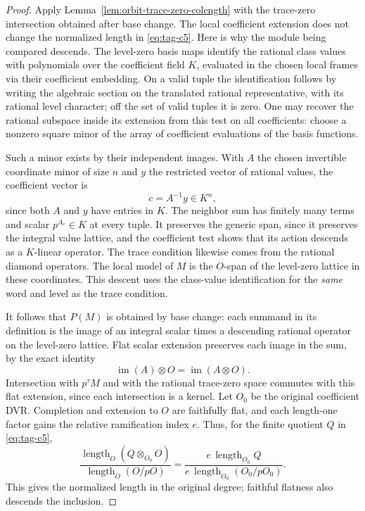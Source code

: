 \begin{proof}

Apply Lemma~\ref{lem:orbit-trace-zero-colength} with the
trace-zero intersection obtained after base change.
The local coefficient extension does not change the normalized
length in \eqref{eq:tag-c5}. Here is why the module being compared descends.
The level-zero basis maps identify the rational class values with
polynomials over the coefficient field \(K\), evaluated in the
chosen local frames via their coefficient embedding. On a valid tuple
the identification follows by writing the algebraic section on the
translated rational representative, with its rational level character;
off the set of valid tuples it is zero. One may recover the rational
subspace inside its extension from this test on all coefficients:
choose a nonzero square minor of the array of coefficient evaluations
of the basis functions.

Such a minor exists by their independent
images. With \(A\) the chosen invertible coordinate minor of size \(n\) and \(y\) the restricted vector of rational values, the coefficient vector is
\[
  c=A^{-1}y\in K^n,
\]
since both \(A\) and \(y\) have entries in \(K\).
The neighbor sum has finitely many terms and scalar \(p^{A_r}\in K\)
at every tuple. It preserves the generic span, since it preserves
the integral value lattice, and the coefficient test shows that its
action descends as a \(K\)-linear operator. The trace condition
likewise comes from the rational diamond operators. The local model
of \(M\) is the \(O\)-span of the level-zero lattice in these
coordinates. This descent uses the class-value identification for the
\emph{same} word and level as the trace condition.

It follows that \(P(M)\) is obtained by base change: each summand
in its definition is the image of an integral scalar times a
descending rational operator on the level-zero lattice.
Flat scalar extension preserves each image in the sum, by the exact identity
\[
  \operatorname{im}(A)\otimes O=\operatorname{im}(A\otimes O).
\]
Intersection with \(p^\tau M\) and with the rational trace-zero
space commutes with this flat extension, since each intersection
is a kernel. Let \(O_0\) be the original coefficient DVR. Completion
and extension to \(O\) are faithfully flat, and each length-one
factor gains the relative ramification index \(e\). Thus, for the
finite quotient \(Q\) in \eqref{eq:tag-c5},
\[
 \frac{\operatorname{length}_O(Q\otimes_{O_0}O)}
      {\operatorname{length}_O(O/pO)}
 =\frac{e\,\operatorname{length}_{O_0}Q}
       {e\,\operatorname{length}_{O_0}(O_0/pO_0)} .
\]
This gives the normalized length in the original degree; faithful
flatness also descends the inclusion.


\end{proof}
